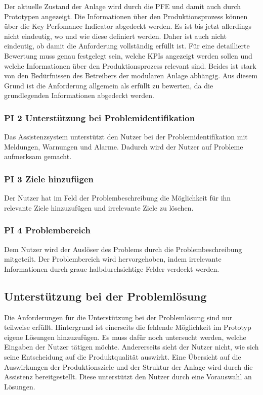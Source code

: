 Der aktuelle Zustand der Anlage wird durch die PFE und damit auch durch Prototypen angezeigt. Die Informationen über den Produktionsprozess können über die Key Perfomance Indicator abgedeckt werden. Es ist bis jetzt allerdings nicht eindeutig, wo und wie diese definiert werden. Daher ist auch nicht eindeutig, ob damit die Anforderung vollständig erfüllt ist. Für eine detaillierte Bewertung muss genau festgelegt sein, welche KPIs angezeigt werden sollen und welche Informationen über den Produktionsprozess relevant sind. Beides ist stark von den Bedürfnissen des Betreibers der modularen Anlage abhängig. Aus diesem Grund ist die Anforderung allgemein als erfüllt zu bewerten, da die grundlegenden Informationen abgedeckt werden.


\subsubsection*{PI 2 Unterstützung bei Problemidentifikation}
Das Assistenzsystem unterstützt den Nutzer bei der Problemidentifikation mit Meldungen, Warnungen und Alarme. Dadurch wird der Nutzer auf Probleme aufmerksam gemacht.

\subsubsection*{PI 3 Ziele hinzufügen}
Der Nutzer hat im Feld der Problembeschreibung die Möglichkeit für ihn relevante Ziele hinzuzufügen und irrelevante Ziele zu löschen.

\subsubsection*{PI 4 Problembereich}
Dem Nutzer wird der Auslöser des Problems durch die Problembeschreibung mitgeteilt. Der Problembereich wird hervorgehoben, indem irrelevante Informationen durch graue halbdurchsichtige Felder verdeckt werden.

\subsection{Unterstützung bei der Problemlösung}
Die Anforderungen für die Unterstützung bei der Problemlösung sind nur teilweise erfüllt. Hintergrund ist einerseits die fehlende Möglichkeit im Prototyp eigene Lösungen hinzuzufügen. Es muss dafür noch untersucht werden, welche Eingaben der Nutzer tätigen möchte. Andererseits sieht der Nutzer nicht, wie sich seine Entscheidung auf die Produktqualität auswirkt. Eine Übersicht auf die Auswirkungen der Produktionsziele und der Struktur der Anlage wird durch die Assistenz bereitgestellt. Diese unterstützt den Nutzer durch eine Vorauswahl an Lösungen.

